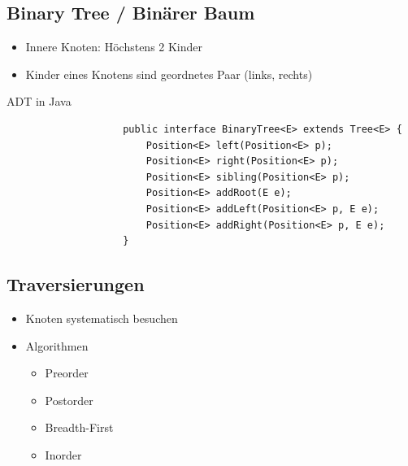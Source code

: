 \documentclass[a4paper, landscape, 8pt]{scrartcl}
\begin{document}
\begin{multicols*}{4}
            \subsection{Binary Tree / Binärer Baum}
                \begin{itemize}
                    \item Innere Knoten: Höchstens 2 Kinder
                    \item Kinder eines Knotens sind geordnetes Paar (links, rechts)
                \end{itemize}
        
                \textcolor{subsectioncolor}{ADT in Java}
                \begin{lstlisting}
                    public interface BinaryTree<E> extends Tree<E> {
                        Position<E> left(Position<E> p);
                        Position<E> right(Position<E> p);
                        Position<E> sibling(Position<E> p);
                        Position<E> addRoot(E e);
                        Position<E> addLeft(Position<E> p, E e);
                        Position<E> addRight(Position<E> p, E e);
                    }
                \end{lstlisting}

            \subsection{Traversierungen}
                \begin{itemize}
                    \item Knoten systematisch besuchen
                    \item Algorithmen
                    \begin{itemize}
                        \item Preorder
                        \item Postorder
                        \item Breadth-First
                        \item Inorder
                    \end{itemize}
                \end{itemize}
        

\end{multicols*}
\end{document}
